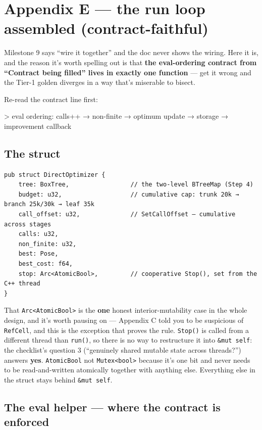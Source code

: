 \documentclass[11pt]{article}
\begin{document}
\section{Appendix E — the run loop assembled (contract-faithful)}
\label{sec:org53fd74e}

Milestone 9 says ``wire it together'' and the doc never shows the wiring. Here it
is, and the reason it's worth spelling out is that \textbf{\textbf{the eval-ordering contract
from ``Contract being filled'' lives in exactly one function}} — get it wrong and
the Tier-1 golden diverges in a way that's miserable to bisect.

Re-read the contract line first:

> eval ordering: calls++ → non-finite → optimum update → storage → improvement callback
\subsection{The struct}
\label{sec:orgf141497}

\begin{verbatim}
pub struct DirectOptimizer {
    tree: BoxTree,                 // the two-level BTreeMap (Step 4)
    budget: u32,                   // cumulative cap: trunk 20k → branch 25k/30k → leaf 35k
    call_offset: u32,              // SetCallOffset — cumulative across stages
    calls: u32,
    non_finite: u32,
    best: Pose,
    best_cost: f64,
    stop: Arc<AtomicBool>,         // cooperative Stop(), set from the C++ thread
}
\end{verbatim}

That \texttt{Arc<AtomicBool>} is the \textbf{one} honest interior-mutability case in the
whole design, and it's worth pausing on — Appendix C told you to be suspicious
of \texttt{RefCell}, and this is the exception that proves the rule. \texttt{Stop()} is
called from a different thread than \texttt{run()}, so there is no way to restructure
it into \texttt{\&mut self}: the checklist's question 3 (``genuinely shared mutable
state across threads?'') answers \textbf{yes}. \texttt{AtomicBool} not \texttt{Mutex<bool>} because
it's one bit and never needs to be read-and-written atomically together with
anything else. Everything else in the struct stays behind \texttt{\&mut self}.
\subsection{The eval helper — where the contract is enforced}
\label{sec:org9e959f9}
\end{document}
